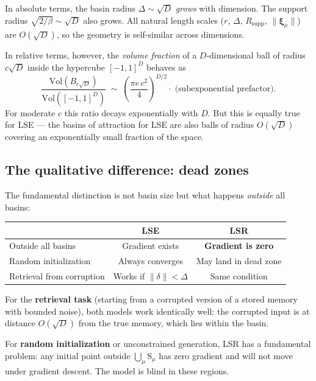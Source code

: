 \documentclass[11pt]{article}
\begin{document}
In absolute terms, the basin radius $\Delta \sim \sqrt{D}$ \emph{grows} with
dimension.  The support radius $\sqrt{2/\beta}\sim\sqrt{D}$ also grows.
All natural length scales ($r$, $\Delta$, $R_{\mathrm{supp}}$, $\|\boldsymbol{\xi}_\mu\|$)
are $O(\sqrt{D})$, so the geometry is self-similar across dimensions.

In relative terms, however, the \emph{volume fraction} of a $D$-dimensional
ball of radius $c\sqrt{D}$ inside the hypercube $[-1,1]^D$ behaves as
\begin{equation}
  \frac{\mathrm{Vol}(B_{c\sqrt{D}})}{\mathrm{Vol}([-1,1]^D)}
  \;\sim\;
  \left(\frac{\pi e\, c^2}{4}\right)^{D/2}
  \!\!\cdot\; \text{(subexponential prefactor)}.
\end{equation}
For moderate $c$ this ratio decays exponentially with $D$.  But this is
equally true for LSE --- the basins of attraction for LSE are also balls of
radius $O(\sqrt{D})$ covering an exponentially small fraction of the space.

\subsection{The qualitative difference: dead zones}

The fundamental distinction is not basin size but what happens \emph{outside}
all basins:

\begin{center}
\begin{tabular}{lcc}
\toprule
& \textbf{LSE} & \textbf{LSR} \\
\midrule
Outside all basins & Gradient exists & \textbf{Gradient is zero} \\
Random initialization & Always converges & May land in dead zone \\
Retrieval from corruption & Works if $\|\delta\| < \Delta$ &
  Same condition \\
\bottomrule
\end{tabular}
\end{center}

For the \textbf{retrieval task} (starting from a corrupted version of a
stored memory with bounded noise), both models work identically well:
the corrupted input is at distance $O(\sqrt{D})$ from the true memory,
which lies within the basin.

For \textbf{random initialization} or unconstrained generation, LSR has a
fundamental problem: any initial point outside $\bigcup_\mu \mathrm{S}_\mu$
has zero gradient and will not move under gradient descent.  The model is
blind in these regions.
\end{document}
